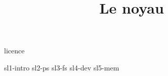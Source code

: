 \documentclass [xcolor=table] {beamer}
\title {Le noyau}
\begin{document}

 {licence}

 {sl1-intro}
 {sl2-ps}
 {sl3-fs}
 {sl4-dev}
 {sl5-mem}
\end{document}
